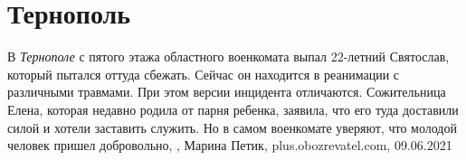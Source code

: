  
 
 
 
 
\chapter{Тернополь}
\label{sec:slova.ternopol}

В \emph{Тернополе} с пятого этажа областного военкомата выпал 22-летний
Святослав, который пытался оттуда сбежать. Сейчас он находится в реанимации с
различными травмами. При этом версии инцидента отличаются. Сожительница Елена,
которая недавно родила от парня ребенка, заявила, что его туда доставили силой
и хотели заставить служить. Но в самом военкомате уверяют, что молодой человек
пришел добровольно,
, Марина Петик, plus.obozrevatel.com, 09.06.2021

